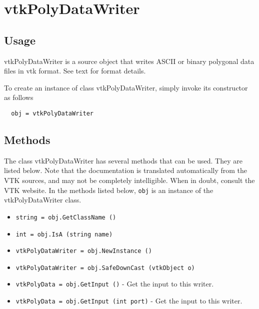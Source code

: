 \section{vtkPolyDataWriter}

\subsection{Usage}

 vtkPolyDataWriter is a source object that writes ASCII or binary 
 polygonal data files in vtk format. See text for format details.

To create an instance of class vtkPolyDataWriter, simply
invoke its constructor as follows
\begin{verbatim}
  obj = vtkPolyDataWriter
\end{verbatim}
\subsection{Methods}

The class vtkPolyDataWriter has several methods that can be used.
  They are listed below.
Note that the documentation is translated automatically from the VTK sources,
and may not be completely intelligible.  When in doubt, consult the VTK website.
In the methods listed below, \verb|obj| is an instance of the vtkPolyDataWriter class.
\begin{itemize}
\item  \verb|string = obj.GetClassName ()|

\item  \verb|int = obj.IsA (string name)|

\item  \verb|vtkPolyDataWriter = obj.NewInstance ()|

\item  \verb|vtkPolyDataWriter = obj.SafeDownCast (vtkObject o)|

\item  \verb|vtkPolyData = obj.GetInput ()| -  Get the input to this writer.

\item  \verb|vtkPolyData = obj.GetInput (int port)| -  Get the input to this writer.

\end{itemize}

